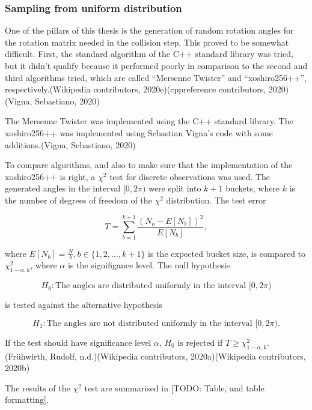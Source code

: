 \documentclass[
]{article}
\begin{document}
\hypertarget{sampling-from-uniform-distribution}{%
\subsubsection{Sampling from uniform
distribution}\label{sampling-from-uniform-distribution}}

One of the pillars of this thesis is the generation of random rotation
angles for the rotation matrix needed in the collision step. This proved
to be somewhat difficult. First, the standard algorithm of the C++
standard library was tried, but it didn't qualify because it performed
poorly in comparison to the second and third algorithms tried, which are
called ``Mersenne Twister'' and ``xoshiro256++'',
respectively.(Wikipedia contributors, 2020e)(cppreference contributors,
2020)(Vigna, Sebastiano, 2020)

The Mersenne Twister was implemented using the C++ standard library. The
xoshiro256++ was implemented using Sebastian Vigna's code with some
additions.(Vigna, Sebastiano, 2020)

To compare algorithms, and also to make sure that the implementation of
the xoshiro256++ is right, a \(\chi^2\) test for discrete observations
was used. The generated angles in the interval \([0, 2\pi)\) were split
into \(k+1\) buckets, where \(k\) is the number of degrees of freedom of
the \(\chi^2\) distribution. The test error

\begin{equation}
T = \sum_{b=1}^{k+1}{\frac{(N_o - E[N_b])^2}{E[N_b]}},
\end{equation}

where \(E[N_b] = \frac{N}{b}, b \in \{1, 2, \dots , k+1\}\) is the
expected bucket size, is compared to \(\chi^2_{1-\alpha, k}\), where
\(\alpha\) is the signifigance level. The null hypothesis

\[
H_0: \textrm{The angles are distributed uniformly in the interval } [0, 2 \pi)
\]

is tested against the alternative hypothesis

\[
H_1: \textrm{The angles are not distributed uniformly in the interval } [0, 2 \pi) \textrm{.}
\]

If the test should have significance level \(\alpha\), \(H_0\) is
rejected if \(T \ge \chi^2_{1-\alpha, k}\).(Frühwirth, Rudolf,
n.d.)(Wikipedia contributors, 2020a)(Wikipedia contributors, 2020b)

The results of the \(\chi^2\) test are summarised in {[}TODO: Table, and
table formatting{]}.
\end{document}
